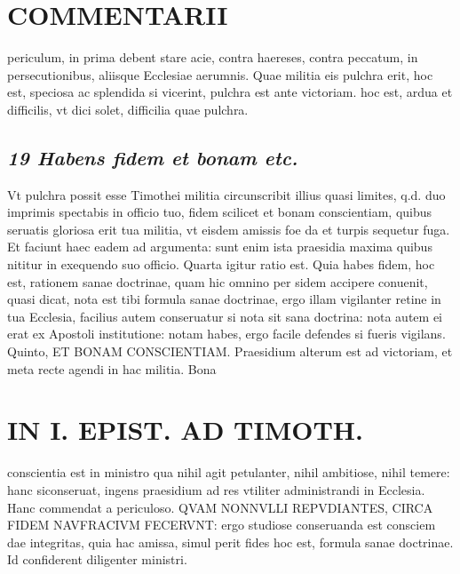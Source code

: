 \documentclass{article}
\begin{document}
\begin{pages}
\section*{COMMENTARII }
\marginpar{[ p.40 ]}\pstart periculum, in prima debent stare acie, contra haereses, contra peccatum, in persecutionibus, aliisque Ecclesiae aerumnis. Quae militia eis pulchra erit, hoc est, speciosa ac splendida si vicerint, pulchra est ante victoriam. hoc est, ardua et difficilis, vt dici solet, difficilia quae pulchra.  \pend
{}
{}
\subsection*{\textit{19 Habens fidem et bonam etc. }}\pstart Vt pulchra possit esse Timothei militia circunscribit illius quasi limites, q.d. duo imprimis spectabis in officio tuo, fidem scilicet et bonam conscientiam, quibus seruatis gloriosa erit tua militia, vt eisdem amissis foe da et turpis sequetur fuga. Et faciunt haec eadem ad argumenta: sunt enim ista praesidia maxima quibus nititur in exequendo suo officio.  \pend\pstart Quarta igitur ratio est. Quia habes fidem, hoc est, rationem sanae doctrinae, quam hic omnino per sidem accipere conuenit, quasi dicat, nota est tibi formula sanae doctrinae, ergo illam vigilanter retine in tua Ecclesia, facilius autem conseruatur si nota sit sana doctrina: nota autem ei erat ex Apostoli institutione: notam habes, ergo facile defendes si fueris vigilans.  \pend\pstart Quinto, ET BONAM CONSCIENTIAM. Praesidium alterum est ad victoriam, et meta recte agendi in hac militia. Bona  \pend
\section*{IN I. EPIST. AD TIMOTH. }
\marginpar{[ p.41 ]}\pstart conscientia est in ministro qua nihil agit petulanter, nihil ambitiose, nihil temere: hanc siconseruat, ingens praesidium ad res vtiliter administrandi in Ecclesia. Hanc commendat a periculoso. QVAM NONNVLLI REPVDIANTES, CIRCA FIDEM NAVFRACIVM FECERVNT: ergo studiose conseruanda est consciem dae integritas, quia hac amissa, simul perit fides hoc est, formula sanae doctrinae. Id confiderent diligenter ministri.  \pend
{}
{}

\end{pages}
\end{document}
